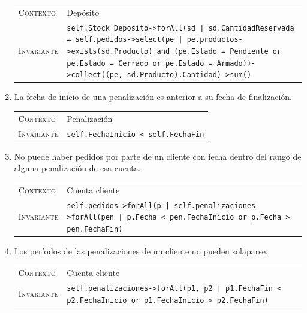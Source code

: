 \begin{enumerate}
    \begin{center}
    \begin{tabular}{p{} p{}}
        \textsc{Contexto} & Depósito \\
        \textsc{Invariante} & \texttt{self.Stock Deposito->forAll(sd | sd.CantidadReservada = self.pedidos->select(pe | pe.productos->exists(sd.Producto) and (pe.Estado = Pendiente or pe.Estado = Cerrado or pe.Estado = Armado))->collect((pe, sd.Producto).Cantidad)->sum()} \\
    \end{tabular}
    \end{center}
    
        \item La fecha de inicio de una penalización es anterior a su fecha de finalización.

    \begin{center}
    \begin{tabular}{p{} p{}}
        \textsc{Contexto} & Penalización \\
        \textsc{Invariante} & \texttt{self.FechaInicio <\ self.FechaFin} \\
    \end{tabular}
    \end{center}

    \item No puede haber pedidos por parte de un cliente con fecha dentro del
    rango de alguna penalización de esa cuenta.

    \begin{center}
    \begin{tabular}{p{} p{}}
        \textsc{Contexto} & Cuenta cliente \\
        \textsc{Invariante} & \texttt{self.pedidos->forAll(p |
        self.penalizaciones->forAll(pen | p.Fecha < pen.FechaInicio or p.Fecha > pen.FechaFin)} \\
    \end{tabular}
    \end{center}

    \item Los períodos de las penalizaciones de un cliente no pueden solaparse.

    \begin{center}
    \begin{tabular}{p{} p{}}
        \textsc{Contexto} & Cuenta cliente \\
        \textsc{Invariante} & \texttt{self.penalizaciones->forAll(p1, p2 |
        p1.FechaFin < p2.FechaInicio or p1.FechaInicio > p2.FechaFin)} \\
    \end{tabular}
    \end{center}


\end{enumerate}
